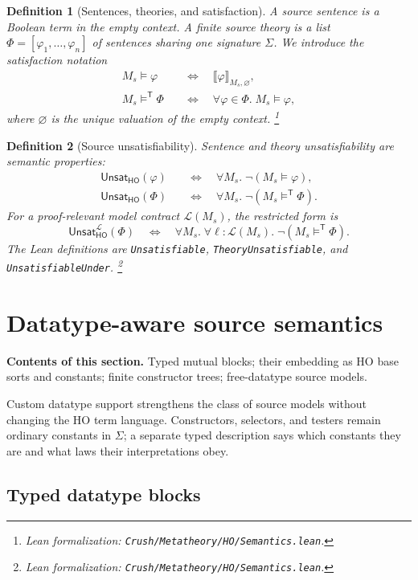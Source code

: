 \documentclass[11pt]{article}
\newtheorem{definition}{Definition}[section]
\theoremstyle{remark}
\newcommand{\leanfile}[1]{\footnote{Lean formalization: \texttt{Crush/Metatheory/#1}.}}
\newcommand{\sectioncontents}[1]{%
  \smallskip\noindent\textbf{Contents of this section.} #1\par\medskip}
\newcommand{\den}[3]{\llbracket #1\rrbracket_{#2,#3}}
\newcommand{\sat}{\models}
\newcommand{\satt}{\models^{\mathsf T}}
\newcommand{\unsat}{\mathsf{Unsat}}
\begin{document}
\begin{definition}[Sentences, theories, and satisfaction]
A source sentence is a Boolean term in the empty context. A finite source
theory is a list $\Phi=[\varphi_1,\ldots,\varphi_n]$ of sentences sharing one
signature $\Sigma$. We introduce the satisfaction notation
\[
\begin{aligned}
 M_s\sat\varphi
   &\quad\Longleftrightarrow\quad
     \den{\varphi}{M_s}{\varnothing},\\
 M_s\satt\Phi
   &\quad\Longleftrightarrow\quad
     \forall\varphi\in\Phi.\;M_s\sat\varphi,
\end{aligned}
\]
where $\varnothing$ is the unique valuation of the empty context.
\leanfile{HO/Semantics.lean}
\end{definition}

\begin{definition}[Source unsatisfiability]
Sentence and theory unsatisfiability are semantic properties:
\[
\begin{aligned}
 \unsat_{\mathsf{HO}}(\varphi)
   &\quad\Longleftrightarrow\quad
     \forall M_s.\;\neg(M_s\sat\varphi),\\
 \unsat_{\mathsf{HO}}(\Phi)
   &\quad\Longleftrightarrow\quad
     \forall M_s.\;\neg(M_s\satt\Phi).
\end{aligned}
\]
For a proof-relevant model contract $\mathcal L(M_s)$, the restricted form is
\[
 \unsat_{\mathsf{HO}}^{\mathcal L}(\Phi)
 \quad\Longleftrightarrow\quad
 \forall M_s.\;\forall \ell:\mathcal L(M_s).\;
   \neg(M_s\satt\Phi).
\]
The Lean definitions are \texttt{Unsatisfiable},
\texttt{TheoryUnsatisfiable}, and \texttt{UnsatisfiableUnder}.
\leanfile{HO/Semantics.lean}
\end{definition}

\section{Datatype-aware source semantics}
\label{sec:datatypes}
\sectioncontents{Typed mutual blocks; their embedding as HO base sorts and constants; finite constructor trees; free-datatype source models.}

Custom datatype support strengthens the class of source models without
changing the HO term language. Constructors, selectors, and testers remain
ordinary constants in $\Sigma$; a separate typed description says which
constants they are and what laws their interpretations obey.

\subsection{Typed datatype blocks}
\end{document}
